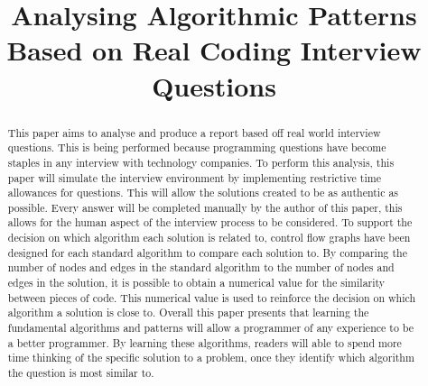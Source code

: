 \documentclass[10pt,twocolumn,hidelinks]{IEEEtran}
\title{Analysing Algorithmic Patterns Based on Real Coding Interview Questions}
\author{\IEEEauthorblockN{Ian Dempsey,\\
Computer Science Department,\\
Maynooth University,\\
Email: ian.dempsey.2013@mumail.ie}
}
\begin{document}
\tableofcontents
{}
\listoffigures
\listoftables
\newpage
\maketitle
{}
\newpage
{}
\begin{abstract}
This paper aims to analyse and produce a report based off real world interview questions. This is being performed because programming questions have become staples in any interview with technology companies. To perform this analysis, this paper will simulate the interview environment by implementing restrictive time allowances for questions. This will allow the solutions created to be as authentic as possible. Every answer will be completed manually by the author of this paper, this allows for the human aspect of the interview process to be considered. To support the decision on which algorithm each solution is related to, control flow graphs have been designed for each standard algorithm to compare each solution to. By comparing the number of nodes and edges in the standard algorithm to the number of nodes and edges in the solution, it is possible to obtain a numerical value for the similarity between pieces of code. This numerical value is used to reinforce the decision on which algorithm a solution is close to. Overall this paper presents that learning the fundamental algorithms and patterns will allow a programmer of any experience to be a better programmer. By learning these algorithms, readers will able to spend more time thinking of the specific solution to a problem, once they identify which algorithm the question is most similar to. 
\end{abstract}
\end{document}
